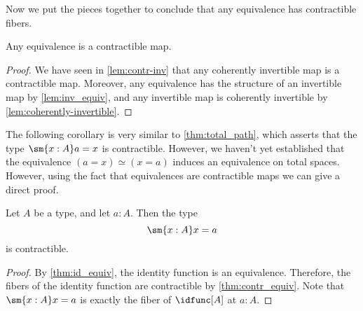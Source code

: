 Now we put the pieces together to conclude that any equivalence has contractible fibers.

\begin{thm}\label{thm:contr_equiv}
Any equivalence is a contractible map.
\end{thm}

\begin{proof}
  We have seen in \cref{lem:contr-inv} that any coherently invertible map is a contractible map. Moreover, any equivalence has the structure of an invertible map by \cref{lem:inv_equiv}, and any invertible map is coherently invertible by \cref{lem:coherently-invertible}.
\end{proof}

The following corollary is very similar to \cref{thm:total_path}, which asserts that the type $\sm{x:A}a=x$ is contractible. However, we haven't yet established that the equivalence $(a=x)\simeq (x=a)$ induces an equivalence on total spaces. However, using the fact that equivalences are contractible maps we can give a direct proof.

\begin{cor}\label{cor:contr_path}
Let $A$ be a type, and let $a:A$. Then the type
\begin{equation*}
\sm{x:A}x=a
\end{equation*}
is contractible.
\end{cor}

\begin{proof}
By \cref{thm:id_equiv}, the identity function is an equivalence. Therefore, the fibers of the identity function are contractible by \cref{thm:contr_equiv}. Note that $\sm{x:A}x=a$ is exactly the fiber of $\idfunc[A]$ at $a:A$.
\end{proof}

